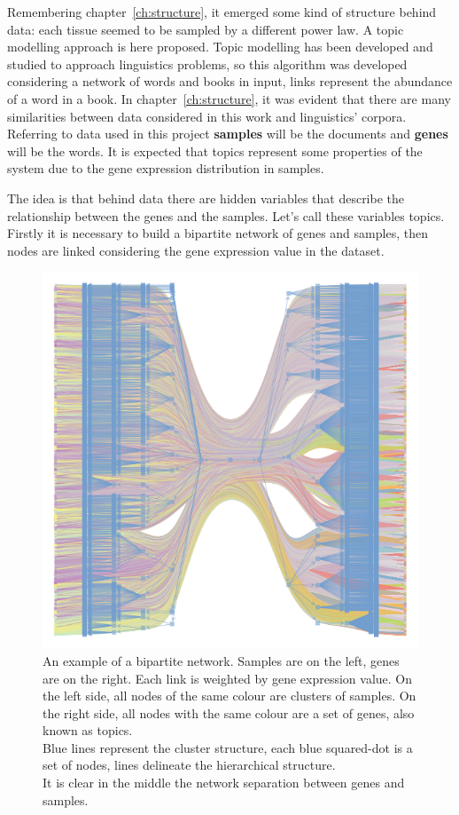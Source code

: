Remembering chapter~\ref{ch:structure}, it emerged some kind of structure behind data: each tissue seemed to be sampled by a different power law. A topic modelling approach is here proposed. Topic modelling has been developed and studied to approach linguistics problems, so this algorithm was developed considering a network of words and books in input, links represent the abundance of a word in a book. In chapter~\ref{ch:structure}, it was evident that there are many similarities between data considered in this work and linguistics' corpora. Referring to data used in this project \textbf{samples} will be the documents and \textbf{genes} will be the words. It is expected that topics represent some properties of the system due to the gene expression distribution in samples.

The idea is that behind data there are hidden variables that describe the relationship between the genes and the samples. Let's call these variables topics.
Firstly it is necessary to build a bipartite network of genes and samples, then nodes are linked considering the gene expression value in the dataset.
\begin{figure}[htb!]
    \centering
    \includegraphics[width=0.7\linewidth]{pictures/topic/bipartite.pdf}
    \caption{An example of a bipartite network. Samples are on the left, genes are on the right. Each link is weighted by gene expression value. On the left side, all nodes of the same colour are clusters of samples. On the right side, all nodes with the same colour are a set of genes, also known as topics.\\
    Blue lines represent the cluster structure, each blue squared-dot is a set of nodes, lines delineate the hierarchical structure.\\
    It is clear in the middle the network separation between genes and samples.}
    \label{fig:topic/bipartite}
\end{figure}

